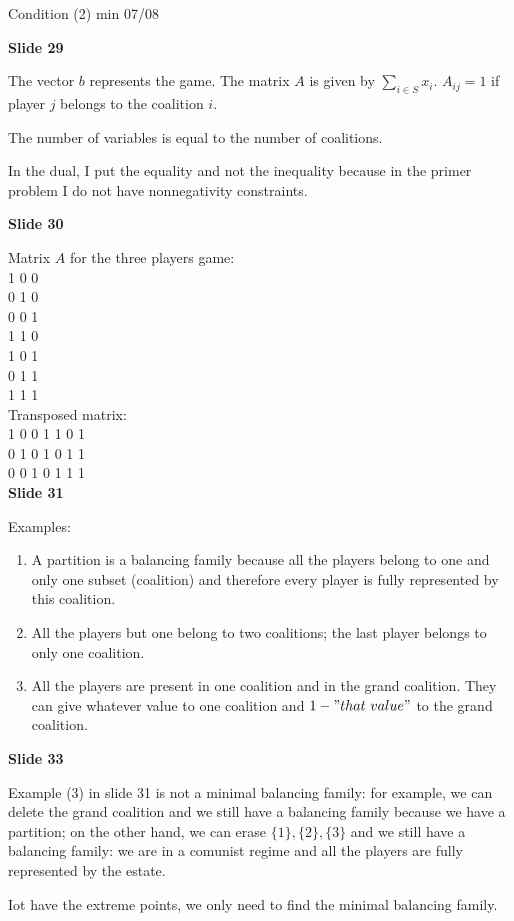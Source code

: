 \noindent Condition (2) {\huge min 07/08}

\bigskip
\noindent \textbf{Slide 29}

\noindent The vector $b$ represents the game. The matrix $A$ is given by 
$\sum_{i \in S}{x_i}$. $A_{ij}=1$ if player $j$ belongs to the coalition $i$.

\noindent The number of variables is equal to the number of coalitions.

\noindent In the dual, I put the equality and not the inequality because in the 
primer problem I do not have nonnegativity constraints.

\bigskip
\noindent \textbf{Slide 30}

\noindent Matrix $A$ for the three players game:\\
1	0	0\\
0	1	0\\
0	0	1\\
1	1	0\\
1	0	1\\
0	1	1\\
1	1	1\\

\noindent Transposed matrix:\\
1	0	0	1	1	0	1\\
0	1	0	1	0	1	1\\
0	0	1	0	1	1	1\\

\bigskip
\noindent \textbf{Slide 31}

\noindent Examples:
\begin{enumerate}
\item A partition is a balancing family because all the players belong to 
one and only one subset (coalition) and therefore every player is fully 
represented by this coalition.
\item All the players but one belong to two coalitions; the 
last player belongs to only one coalition.
\item All the players are present in one coalition and in the grand coalition. 
They can give whatever value to one coalition and $1-"that~value"$ to the 
grand coalition.
\end{enumerate}

\bigskip
\noindent \textbf{Slide 33}

\noindent Example (3) in slide 31 is not a minimal balancing family: for 
example, we can delete the grand coalition and we still have a balancing 
family because we have a partition; on the other hand, we can erase $\{1\}, 
\{2\},\{3\}$ and we still have a balancing family: we are in a comunist 
regime and all the players are fully represented by the estate.

\noindent Iot have the extreme points, we only need to find the minimal 
balancing family.

%

